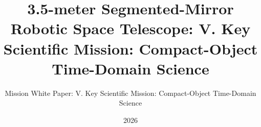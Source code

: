 \newcommand{\wpvolumelabel}{V}
\newcommand{\wpvolumetitle}{Key Scientific Mission: Compact-Object Time-Domain Science}
\title{3.5-meter Segmented-Mirror Robotic Space Telescope: \wpvolumelabel. \wpvolumetitle}
\subtitle{Mission White Paper: \wpvolumelabel. \wpvolumetitle}
\newcommand{\wpauthors}{Juhan Kim$^{1}$, Yong-Woo Kang$^{2}$, Sang Hyun Lee$^{2,3}$, Jeong-Yeol Han$^{2,4}$, Sungwook E. Hong$^{2,4}$, Bongkon Moon$^{2,4}$, Donguk Song$^{2}$, Juhyung Kang$^{2}$, Myeong-Gu Park$^{5}$, Sang Chul Kim$^{2,4}$, Chung-Uk Lee$^{2}$, Sangmo Tony Sohn$^{6}$, Arman Shafieloo$^{2,4}$, David Parkinson$^{2,4}$, Hong Soo Park$^{2,4}$, Dohyeong Kim$^{7}$, Chan Park$^{2}$, Jungjoo Sohn$^{8}$, Young-Beom Jeon$^{2}$, Jong-Hak Woo$^{9}$, Hyung Mok Lee$^{9}$, Hong Bae Ann$^{7}$, Myungkook James Jee$^{10}$, Mansoo Choi$^{2}$, Changbom Park$^{1}$}
\date{2026}
\newcommand{\wpabstract}{%
An isolated compact object retains the point-source resolving power of the space-based slitless spectrograph. The baseline wavelength range is $0.2$--$1.5\,\mu\mathrm{m}$. The planning baseline uses $R\simeq1000$ for broad and faint transient spectra and reserves selectable bands at $R\simeq5000$ for accretion-disk profiles, velocity structure, and precision line ratios. Broad features can be measured after binning the native $R\simeq5000$ data to lower resolution. Rapid-response spectroscopy follows gravitational-wave counterparts and kilonovae from hours to days. Repeated spectra of dwarf novae and compact binaries trace accretion state and orbital phase, while uninterrupted imaging of white dwarfs measures pulsation frequencies. The program combines mission-based monitoring with external alerts, including KGMT transient detections. The instrument study must preserve calibrated throughput to $2.70\,\mu\mathrm{m}$ and evaluate a $3.0\,\mu\mathrm{m}$ operational band edge, with $2.5\,\mu\mathrm{m}$ retained as the formal engineering off-ramp. Mid-infrared imaging is not part of the adopted compact-object baseline.
}
\newcommand{\wpkeywords}{\textbf{Keywords:} compact objects, time-domain astronomy, kilonovae, dwarf novae, white dwarfs, slitless spectroscopy}
\newcommand{\wpchapteroffset}{4}
\newcommand{\MakeVolumeBody}{%
  \definecolor{Blue1}{HTML}{D98A9A}%
  \definecolor{Blue2}{HTML}{B34F68}%
  \definecolor{Blue3}{HTML}{7A2944}%
}
